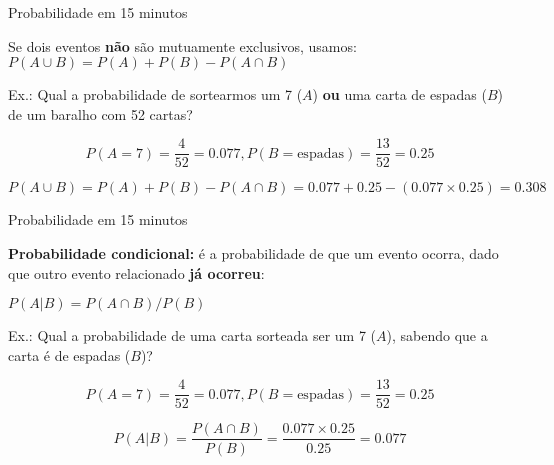 \documentclass{beamer}\usepackage[]{graphicx}\usepackage[]{color}
\begin{document}
\begin{frame}{Probabilidade em 15 minutos}

Se dois eventos \textbf{não} são mutuamente exclusivos, usamos: $P(A \cup B) = P(A) + P(B) - P(A \cap B)$

\alert{Ex.:} Qual a probabilidade de sortearmos um 7 ($A$) \textbf{ou} uma carta de espadas ($B$) de um baralho com 52 cartas?

\begin{equation*}
    P(A=7)= \frac{4}{52} = 0.077, P(B = \text{espadas}) = \frac{13}{52} = 0.25
\end{equation*}

\begin{equation*}
    P(A \cup B) = P(A) + P(B) - P(A \cap B) = 0.077 + 0.25 - (0.077 \times 0.25) = 0.308
\end{equation*}


\end{frame} 


\begin{frame}{Probabilidade em 15 minutos}

\begin{small}

\textbf{Probabilidade condicional:} é a probabilidade de que um evento ocorra, dado que outro evento relacionado \textbf{já ocorreu}:

$P(A|B) = P(A \cap B)/P(B)$

\alert{Ex.:} Qual a probabilidade de uma carta sorteada ser um 7 ($A$), sabendo que a carta é de espadas ($B$)? 

\begin{equation*}
    P(A=7)= \frac{4}{52} = 0.077, P(B = \text{espadas}) = \frac{13}{52} = 0.25
\end{equation*}

\begin{equation*}
    P(A|B) = \frac{P(A \cap B)}{P(B)} = \frac{0.077 \times 0.25}{0.25} = 0.077
\end{equation*}


\end{small}

\end{frame} 
\end{document}
